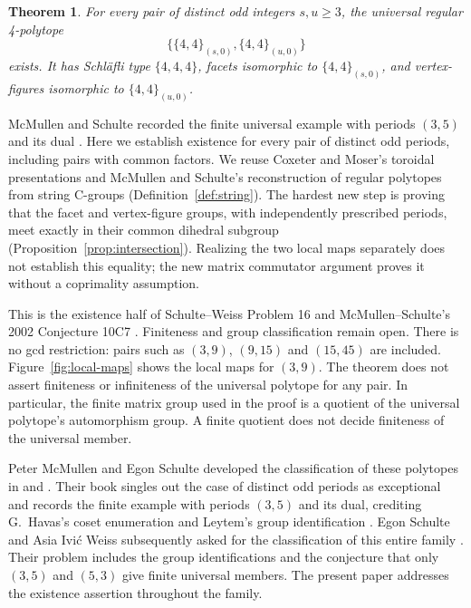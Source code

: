 \documentclass[11pt]{article}
\newtheorem{theorem}{Theorem}[section]
\theoremstyle{definition}
\newcommand{\tor}[1]{\{4,4\}_{(#1,0)}}
\begin{document}
\begin{theorem}\label{thm:main}
For every pair of distinct odd integers $s,u\geq3$, the universal regular
4-polytope
\[
                 \{\tor{s},\tor{u}\}
\]
exists. It has Schläfli type $\{4,4,4\}$, facets isomorphic to $\tor{s}$,
and vertex-figures isomorphic to $\tor{u}$.
\end{theorem}

McMullen and Schulte recorded the finite universal example with periods
$(3,5)$ and its dual \cite[pp.~375--376]{ARP}. Here we establish existence
for every pair of distinct odd periods, including pairs with common
factors. We reuse Coxeter and Moser's toroidal presentations and
McMullen and Schulte's reconstruction of regular polytopes from string
C-groups (Definition~\ref{def:string}). The hardest new step is proving that the facet and vertex-figure
groups, with independently prescribed periods, meet exactly in their
common dihedral subgroup (Proposition~\ref{prop:intersection}). Realizing
the two local maps separately does not establish this equality; the new
matrix commutator argument proves it without a coprimality assumption.

This is the existence half of Schulte--Weiss Problem 16
\cite[Problem 16]{SW} and McMullen--Schulte's 2002 Conjecture 10C7
\cite[p.~376]{ARP}. Finiteness and group classification remain open.
There is no gcd restriction: pairs such as $(3,9)$, $(9,15)$ and $(15,45)$
are included. Figure~\ref{fig:local-maps} shows the local maps for $(3,9)$.
The theorem does not assert finiteness or infiniteness of
the universal polytope for any pair. In particular, the finite matrix
group used in the proof is a quotient of the universal polytope's
automorphism group. A finite quotient does not decide finiteness of the
universal member.

Peter McMullen and Egon Schulte developed the classification of these
polytopes in \cite{MS92} and \cite[Chapter 10]{ARP}. Their book singles out
the case of distinct odd periods as exceptional and records the finite
example with periods $(3,5)$ and its dual, crediting G.~Havas's coset
enumeration and Leytem's group identification \cite[pp.~375--376]{ARP}.
Egon Schulte and Asia Ivi\'c Weiss
subsequently asked for the classification of this entire family
\cite{SW}. Their problem includes the group identifications and the
conjecture that only $(3,5)$ and $(5,3)$ give finite universal members.
The present paper addresses the existence assertion throughout the family.
\end{document}
